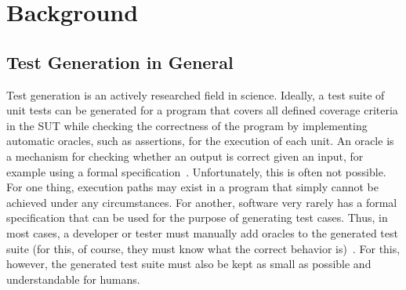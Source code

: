 \documentclass[paper=a4,%
  twoside,%
  BCOR4mm,%
  abstract=true,%
  toc=bibliography,%
  chapterprefix=true,%
  toc=bibliographynumbered,%
  open=right,%
  english,%
  pagesize=pdftex]{scrreprt}
\begin{document}
\clearpage

\chapter{Background}
\label{chap:backgroud}
\section{Test Generation in General}

Test generation is an actively researched field in science. Ideally, a test suite of unit tests can be generated for a program that covers all defined coverage criteria in the \ac{SUT} while checking the correctness of the program by implementing automatic oracles, such as assertions, for the execution of each unit. An oracle is a mechanism for checking whether an output is correct given an input, for example using a formal specification~\cite{McMinn2009}. Unfortunately, this is often not possible. For one thing, execution paths may exist in a program that simply cannot be achieved under any circumstances. For another, software very rarely has a formal specification that can be used for the purpose of generating test cases. Thus, in most cases, a developer or tester must manually add oracles to the generated test suite (for this, of course, they must know what the correct behavior is)~\cite{Fraser_2013}. For this, however, the generated test suite must also be kept as small as possible and understandable for humans.
\end{document}
